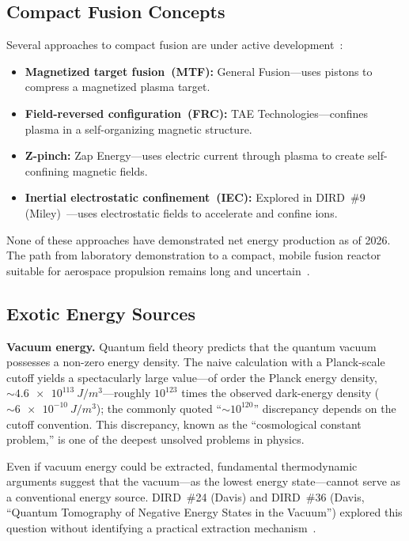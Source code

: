 \documentclass[aps,prd,twocolumn,superscriptaddress,nofootinbib,floatfix]{revtex4-2}
\begin{document}
\subsection{Compact Fusion Concepts}\label{sec:compact-fusion}

Several approaches to compact fusion are under active
development~\cite{DIRD_Miley,DIRD_Teofilo}:
\begin{itemize}
  \item \textbf{Magnetized target fusion~(MTF):} General Fusion---uses pistons to
        compress a magnetized plasma target.
  \item \textbf{Field-reversed configuration~(FRC):} TAE Technologies---confines
        plasma in a self-organizing magnetic structure.
  \item \textbf{Z-pinch:} Zap Energy---uses electric current through plasma to
        create self-confining magnetic fields.
  \item \textbf{Inertial electrostatic confinement~(IEC):} Explored in
        DIRD~\#9 (Miley)~\cite{DIRD_Miley}---uses electrostatic fields to
        accelerate and confine ions.
\end{itemize}
None of these approaches have demonstrated net energy production as of 2026.
The path from laboratory demonstration to a compact, mobile fusion reactor
suitable for aerospace propulsion remains long and
uncertain~\cite{DIRD_Miley,DIRD_Teofilo,LLNL_NIF2025}.

\subsection{Exotic Energy Sources}\label{sec:exotic-energy}

\textbf{Vacuum energy.} Quantum field theory predicts that the quantum vacuum
possesses a non-zero energy density. The naive calculation with a Planck-scale
cutoff yields a spectacularly large value---of order the Planck energy density,
${\sim}\SI{4.6e113}{J/m^{3}}$---roughly $10^{123}$ times the observed dark-energy density
(${\sim}\SI{6e-10}{J/m^{3}}$); the commonly quoted ``${\sim}10^{120}$''
discrepancy depends on the cutoff convention. This discrepancy, known as the
``cosmological constant problem,'' is one of the deepest unsolved problems in
physics.

Even if vacuum energy could be extracted, fundamental thermodynamic arguments
suggest that the vacuum---as the lowest energy state---cannot serve as a
conventional energy source. DIRD~\#24 (Davis) and DIRD~\#36 (Davis, ``Quantum
Tomography of Negative Energy States in the Vacuum'') explored this question
without identifying a practical extraction
mechanism~\cite{DIRD_Davis_Vacuum,DIRD_Davis_Tomography}.
\end{document}
